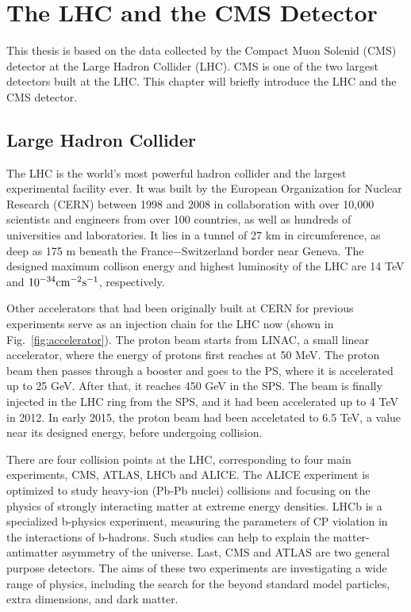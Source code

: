 \chapter{The LHC and the CMS Detector}
This thesis is based on the data collected by the Compact Muon Solenid (CMS) detector at the Large Hadron Collider (LHC). CMS is one of the two largest detectors built at the LHC. This chapter will briefly introduce the LHC and the CMS detector.

\section{Large Hadron Collider}
The LHC is the world's most powerful hadron collider and the largest experimental facility ever. It was built by the European Organization for Nuclear Research (CERN) between 1998 and 2008 in collaboration with over 10,000 scientists and engineers from over 100 countries, as well as hundreds of universities and laboratories. It lies in a tunnel of 27 km in circumference, as deep as 175 m beneath the France$-$Switzerland border near Geneva. The designed maximum collison energy and highest luminosity of the LHC are 14 TeV and $\textup{10}^{-34} \textup{cm}^{-2}\textup{s}^{-1}$, respectively.

Other accelerators that had been originally built at CERN for previous experiments serve as an injection chain for the LHC now (shown in Fig.~\ref{fig:accelerator}). The proton beam starts from LINAC, a small linear accelerator, where the energy of protons first reaches at 50 MeV. The proton beam then passes through a booster and goes to the PS, where it is accelerated up to 25 GeV. After that, it reaches 450 GeV in the SPS. The beam is finally injected in the LHC ring from the SPS, and it had been accelerated up to 4 TeV in 2012. In early 2015, the proton beam had been acceletated to 6.5 TeV, a value near its designed energy, before undergoing collision.

There are four collision points at the LHC, corresponding to four main experiments, CMS, ATLAS, LHCb and ALICE. The ALICE experiment is optimized to study heavy-ion (Pb-Pb nuclei) collisions and focusing on the physics of strongly interacting matter at extreme energy densities. LHCb is a specialized b-physics experiment, measuring the parameters of CP violation in the interactions of b-hadrons. Such studies can help to explain the matter-antimatter asymmetry of the universe. Last, CMS and ATLAS are two general purpose detectors. The aims of these two experiments are investigating a wide range of physics, including the search for the beyond standard model particles, extra dimensions, and dark matter.


